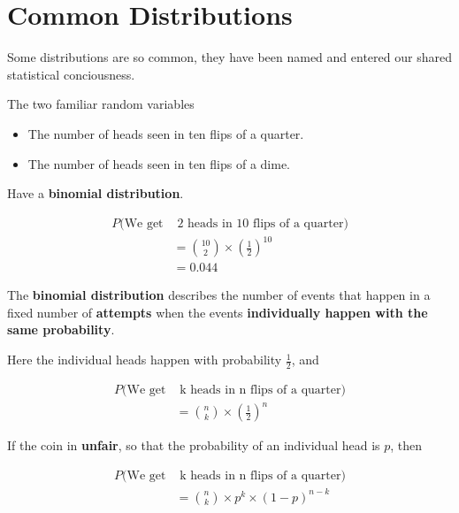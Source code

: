 \section{Common Distributions}

\begin{frame}
Some distributions are so common, they have been named and entered our shared
statistical conciousness.
\end{frame}
%

%
\begin{frame}
The two familiar random variables

\begin{itemize}
\item The number of heads seen in ten flips of a quarter.
\item The number of heads seen in ten flips of a dime.
\end{itemize}

Have a \textbf{binomial distribution}.

\end{frame}
%

%
\begin{frame}

\begin{align*}
P(\text{We get} & \text{ 2 heads in 10 flips of a quarter}) \\
%
&= {{10}\choose{2}} \times \left(\frac{1}{2} \right)^{10} \\
%
&= 0.044
\end{align*}

\end{frame}
%

%
\begin{frame}

The \textbf{binomial distribution} describes the number of events that happen in
a fixed number of \textbf{attempts} when the events \textbf{individually happen
with the same probability}.

Here the individual heads happen with probability $\frac{1}{2}$, and

\begin{align*}
P(\text{We get} & \text{ k heads in n flips of a quarter}) \\
%
&= {{n}\choose{k}} \times \left(\frac{1}{2} \right)^n
\end{align*}

\end{frame}
%

%
\begin{frame}
If the coin in \textbf{unfair}, so that the probability of an individual head is
$p$, then

\begin{align*}
P(\text{We get} & \text{ k heads in n flips of a quarter}) \\
%
&= {{n}\choose{k}} \times p^k \times (1 - p)^{n - k}
\end{align*}

\end{frame}
%

